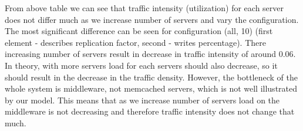 \documentclass[11pt]{article}
\newcommand{\rowstyle}[1]{\gdef\currentrowstyle{#1}%
  #1\ignorespaces
}
\begin{document}
{\small
\begin{center}
\end{center}
}

From above table we can see that traffic intensity (utilization) for each server does not differ much as we increase number of servers and vary the configuration. The most significant difference can be seen for configuration (all, 10) (first element - describes replication factor, second - writes percentage). There increasing number of servers result in decrease in traffic intensity of around 0.06. In theory, 
with more servers load for each servers should also decrease, so it should result in the decrease in the traffic density. However, the bottleneck of the whole system is middleware, not memcached servers, which is not well illustrated by our model. This means that as we increase number of servers load on the middleware is not decreasing and therefore traffic intensity does not change that much.
\end{document}
